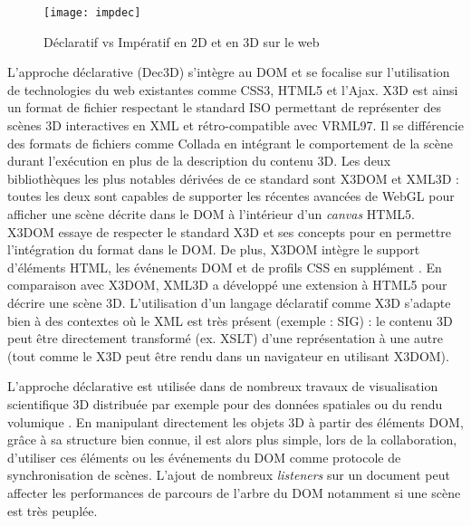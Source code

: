 \begin{figure}[hbt]
	\centering
	\texttt{[image: impdec]}
	\caption{Déclaratif vs Impératif en 2D et en 3D sur le web}
	\label{fig:impdec}
\end{figure}

L'approche déclarative (Dec3D) s'intègre au \gls{DOM} et se 
focalise sur l'utilisation de technologies du web existantes comme CSS3, 
HTML5 et l'Ajax. 
X3D est ainsi un format de fichier respectant le standard ISO \cite{X3D2011} permettant de 
représenter des scènes 3D interactives en XML et rétro-compatible avec VRML97. Il 
se différencie des formats de fichiers comme Collada en intégrant le comportement de 
la scène durant l'exécution en plus de la description du contenu 3D. Les deux 
bibliothèques les plus notables dérivées de ce standard sont X3DOM 
\cite{Behr2010} et XML3D \cite{Sons2010} : toutes les deux sont capables de 
supporter les récentes avancées de WebGL pour afficher une scène décrite dans 
le \gls{DOM} à l'intérieur d'un \textit{canvas} HTML5. 
X3DOM essaye de respecter le standard X3D et ses concepts pour en permettre 
l'intégration du format dans le \gls{DOM}. De plus, X3DOM intègre le support 
d'éléments \gls{HTML}, les événements \gls{DOM} et de profils \acrshort{CSS} en 
supplément \cite{Sutter2015}. 
En comparaison avec X3DOM, XML3D a développé une extension à \gls{HTML}5 
pour décrire une scène 3D. 
L'utilisation d'un langage déclaratif comme X3D s'adapte bien à des contextes où le XML est très présent (exemple : \gls{SIG}) : le contenu 3D peut être directement transformé (ex. XSLT) d'une 
représentation à une autre (tout comme le X3D peut être rendu dans un navigateur 
en utilisant X3DOM). 

L'approche déclarative est utilisée dans de nombreux travaux de visualisation 
scientifique 3D distribuée \cite{Jung2012} par exemple pour des données spatiales 
\cite{Stein2014} ou du rendu volumique \cite{Becher2012}. 
En manipulant directement les objets 3D à partir des éléments \gls{DOM}, grâce à 
sa structure bien connue, il est alors plus simple, lors de la collaboration, d'utiliser 
ces éléments \cite{Gadea2016} ou les événements du \gls{DOM} \cite{Lowet2009} 
comme protocole de synchronisation de scènes. 
L'ajout de nombreux \textit{listeners} sur un document peut affecter les 
performances de parcours de l'arbre du \gls{DOM} notamment si une scène est
très peuplée.

